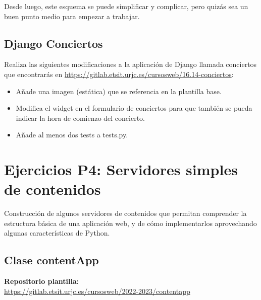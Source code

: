 Desde luego, este esquema se puede simplificar y complicar, pero quizás sea un buen punto medio para empezar a trabajar.

\subsection{Django Conciertos}
\label{subsec:django-conciertos}

Realiza las siguientes modificaciones a la aplicación de Django llamada conciertos que encontrarás en \url{https://gitlab.etsit.urjc.es/cursosweb/16.14-conciertos}:

\begin{itemize}
  \item Añade una imagen (estática) que se referencia en la plantilla base.
  \item Modifica el widget en el formulario de conciertos para que también se pueda indicar la hora de comienzo del concierto.
  \item Añade al menos dos tests a tests.py.
\end{itemize}

\section{Ejercicios P4: Servidores simples de contenidos}

Construcción de algunos servidores de contenidos que permitan comprender la estructura básica de una aplicación web, y de cómo implementarlos aprovechando algunas características de Python.

\subsection{Clase contentApp}
\label{subsec:contentapp}

\textbf{Repositorio plantilla:} \\
\url{https://gitlab.etsit.urjc.es/cursosweb/2022-2023/contentapp}

